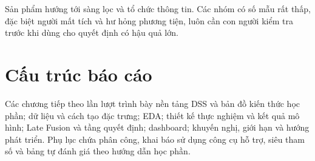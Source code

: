 Sản phẩm hướng tới sàng lọc và tổ chức thông tin. Các nhóm có số mẫu rất thấp,
đặc biệt người mất tích và hư hỏng phương tiện, luôn cần con người kiểm tra
trước khi dùng cho quyết định có hậu quả lớn.

\section{Cấu trúc báo cáo}

Các chương tiếp theo lần lượt trình bày nền tảng DSS và bản đồ kiến thức học
phần; dữ liệu và cách tạo đặc trưng; EDA; thiết kế thực nghiệm và kết quả mô
hình; Late Fusion và tầng quyết định; dashboard; khuyến nghị, giới hạn và hướng
phát triển. Phụ lục chứa phân công, khai báo sử dụng công cụ hỗ trợ, siêu tham
số và bảng tự đánh giá theo hướng dẫn học phần.
